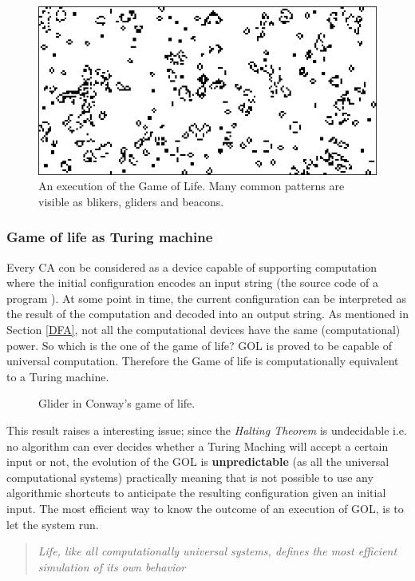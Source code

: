 \begin{figure}
\centering
\caption[GOL execution example.]{An execution of the Game of Life. Many common patterns are visible as blikers, gliders and beacons.}
\label{gameoflife}
\includegraphics[width=1.0\textwidth]{./images/CA_FDM/game-of-life}
\end{figure}

\subsubsection{Game of life as Turing machine}
Every CA con be considered as a device capable of supporting computation where the
initial configuration  encodes an input string (the source code of a program ). At
some point in time, the current configuration can be interpreted as the result of the
computation and decoded into an output string. As mentioned in Section
\ref{DFA}, not all the computational devices have the same (computational) power.
So which is the one of the game of life? GOL is proved to be capable of universal computation.
Therefore the Game of life is computationally equivalent to a Turing machine\cite{berlekamp1982}.
\begin{figure}
\centering
\caption[The \textit{Glider} block in the Conway's game of life.]{Glider in Conway's game of life.}
\label{fig:glider}
\setlength{\fboxrule}{1pt}%
\end{figure}
This result raises a interesting issue; since the \emph{Halting
Theorem} is undecidable i.e. no algorithm can ever decides whether a Turing Maching will accept a certain input or not,
the evolution of the GOL is \textbf{unpredictable} (as all the universal computational systems) practically meaning that is
not possible to use any algorithmic shortcuts to anticipate the resulting
configuration given an initial input. 
The most efficient way to know the outcome of an execution of GOL, is to let the system run.
\begin{quotation}
\em Life, like all computationally universal systems, defines the most efficient
simulation of its own behavior\cite{Ilachinski2001}
\end{quotation}



